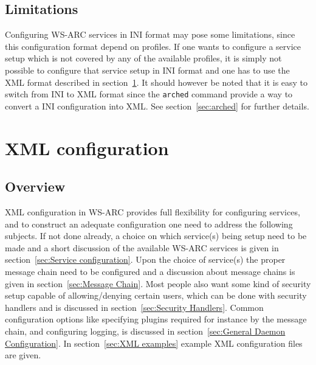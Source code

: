 \documentclass{article}
\begin{document}
\subsection{Limitations}
Configuring WS-ARC services in INI format may pose some limitations, since this
configuration format depend on profiles. If one wants to configure a service
setup which is not covered by any of the available profiles, it is simply not
possible to configure that service setup in INI format and one has to use the
XML format described in section~\ref{sec:XML configuration}. It should however
be noted that it is easy to switch from INI to XML format since the
\texttt{arched} command provide a way to convert a INI configuration into XML.
See section~\ref{sec:arched} for further details.

\section{XML configuration}\label{sec:XML configuration}
\subsection{Overview}
XML configuration in WS-ARC provides full flexibility for configuring services,
and to construct an adequate configuration one need to address the following
subjects. If not done already, a choice on which service(s) being setup need to
be made and a short discussion of the available WS-ARC services is given in
section~\ref{sec:Service configuration}. Upon the choice of service(s) the
proper message chain need to be configured and a discussion about message chains
is given in section~\ref{sec:Message Chain}. Most people also want some kind of
security setup capable of allowing/denying certain users, which can be done with
security handlers and is discussed in section~\ref{sec:Security Handlers}.
Common configuration options like specifying plugins required for instance by
the message chain, and configuring logging, is discussed in
section~\ref{sec:General Daemon Configuration}. In
section~\ref{sec:XML examples} example XML configuration files are given.
\end{document}
